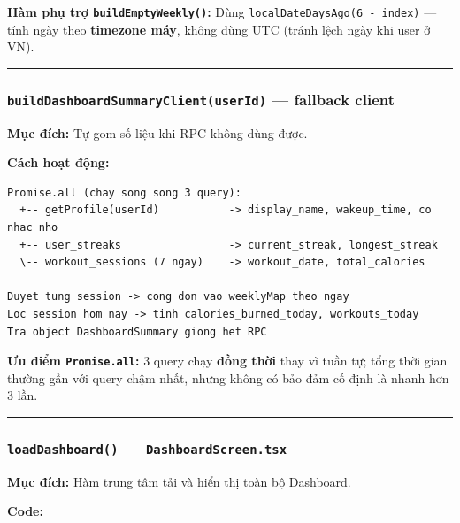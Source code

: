 \documentclass[12pt,a4paper]{article}
\begin{document}
\textbf{Hàm phụ trợ \texttt{buildEmptyWeekly()}:} Dùng
\texttt{localDateDaysAgo(6\ -\ index)} --- tính ngày theo
\textbf{timezone máy}, không dùng UTC (tránh lệch ngày khi user ở VN).

\begin{center}\rule{0.5\linewidth}{0.5pt}\end{center}

\subsubsection{\texorpdfstring{\texttt{buildDashboardSummaryClient(userId)}
--- fallback
client}{buildDashboardSummaryClient(userId) --- fallback client}}\label{builddashboardsummaryclientuserid-fallback-client}

\textbf{Mục đích:} Tự gom số liệu khi RPC không dùng được.

\textbf{Cách hoạt động:}

\begin{verbatim}
Promise.all (chay song song 3 query):
  +-- getProfile(userId)           -> display_name, wakeup_time, co nhac nho
  +-- user_streaks                 -> current_streak, longest_streak
  \-- workout_sessions (7 ngay)    -> workout_date, total_calories

Duyet tung session -> cong don vao weeklyMap theo ngay
Loc session hom nay -> tinh calories_burned_today, workouts_today
Tra object DashboardSummary giong het RPC
\end{verbatim}

\textbf{Ưu điểm \texttt{Promise.all}:} 3 query chạy \textbf{đồng thời}
thay vì tuần tự; tổng thời gian thường gần với query chậm nhất, nhưng
không có bảo đảm cố định là nhanh hơn 3 lần.

\begin{center}\rule{0.5\linewidth}{0.5pt}\end{center}

\subsubsection{\texorpdfstring{\texttt{loadDashboard()} ---
\texttt{DashboardScreen.tsx}}{loadDashboard() --- DashboardScreen.tsx}}\label{loaddashboard-dashboardscreen.tsx}

\textbf{Mục đích:} Hàm trung tâm tải và hiển thị toàn bộ Dashboard.

\textbf{Code:}
\end{document}
